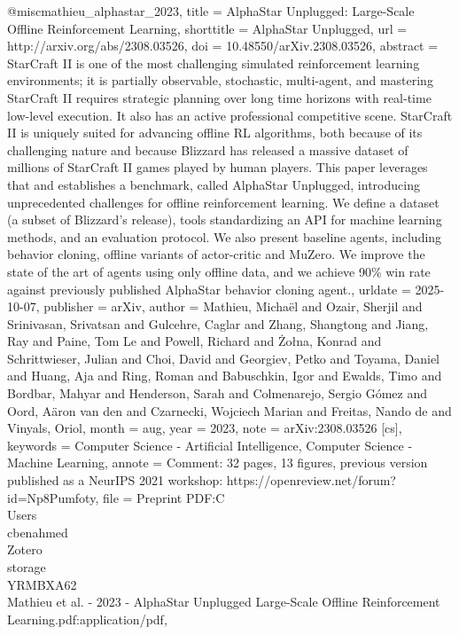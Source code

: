 @misc{mathieu_alphastar_2023,
	title = {{AlphaStar} {Unplugged}: {Large}-{Scale} {Offline} {Reinforcement} {Learning}},
	shorttitle = {{AlphaStar} {Unplugged}},
	url = {http://arxiv.org/abs/2308.03526},
	doi = {10.48550/arXiv.2308.03526},
	abstract = {StarCraft II is one of the most challenging simulated reinforcement learning environments; it is partially 
observable, stochastic, multi-agent, and mastering StarCraft II requires strategic planning over long time horizons with 
real-time low-level execution. It also has an active professional competitive scene. StarCraft II is uniquely suited for 
advancing offline RL algorithms, both because of its challenging nature and because Blizzard has released a massive dataset of 
millions of StarCraft II games played by human players. This paper leverages that and establishes a benchmark, called AlphaStar 
Unplugged, introducing unprecedented challenges for offline reinforcement learning. We define a dataset (a subset of Blizzard's 
release), tools standardizing an API for machine learning methods, and an evaluation protocol. We also present baseline agents, 
including behavior cloning, offline variants of actor-critic and MuZero. We improve the state of the art of agents using only 
offline data, and we achieve 90\% win rate against previously published AlphaStar behavior cloning agent.},
	urldate = {2025-10-07},
	publisher = {arXiv},
	author = {Mathieu, Michaël and Ozair, Sherjil and Srinivasan, Srivatsan and Gulcehre, Caglar and Zhang, Shangtong and 
Jiang, Ray and Paine, Tom Le and Powell, Richard and Żołna, Konrad and Schrittwieser, Julian and Choi, David and Georgiev, Petko 
and Toyama, Daniel and Huang, Aja and Ring, Roman and Babuschkin, Igor and Ewalds, Timo and Bordbar, Mahyar and Henderson, Sarah 
and Colmenarejo, Sergio Gómez and Oord, Aäron van den and Czarnecki, Wojciech Marian and Freitas, Nando de and Vinyals, Oriol},
	month = aug,
	year = {2023},
	note = {arXiv:2308.03526 [cs]},
	keywords = {Computer Science - Artificial Intelligence, Computer Science - Machine Learning},
	annote = {Comment: 32 pages, 13 figures, previous version published as a NeurIPS 2021 workshop: 
https://openreview.net/forum?id=Np8Pumfoty},
	file = {Preprint PDF:C\:\\Users\\cbenahmed\\Zotero\\storage\\YRMBXA62\\Mathieu et al. - 2023 - AlphaStar Unplugged 
Large-Scale Offline Reinforcement Learning.pdf:application/pdf},
}


